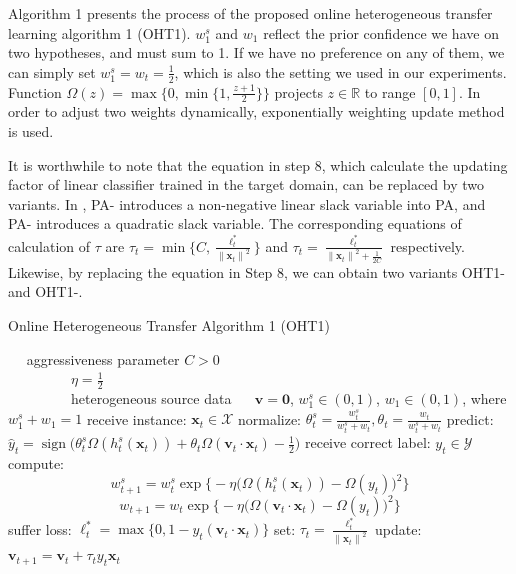 \documentclass[letterpaper]{article}
\theoremstyle{remark}
\theoremstyle{definition}
\DeclareMathOperator{\sign}{sign}
\begin{document}
Algorithm 1 presents the process of the proposed online heterogeneous transfer learning algorithm 1 (OHT1).
$w_{1}^{s}$ and $w_1$ reflect the prior confidence we have on two hypotheses, and must sum to 1.
If we have no preference on any of them, we can simply set $w_{1}^{s} = w_{t} = \frac{1}{2}$, which is also the setting we used in our experiments.
Function $\varOmega(z) = \max \{ 0, \min \{ 1, \frac{z+1}{2} \}\}$ projects $z \in \mathbb{R}$ to range $[0,1]$.
In order to adjust two weights dynamically, exponentially weighting update method \cite{cesa2006prediction} is used.

It is worthwhile to note that the equation in step 8, which calculate the updating factor of linear classifier trained in the target domain, can be replaced by two variants.
In \cite{crammer2006online}, PA-\uppercase\expandafter{} introduces a non-negative linear slack variable into PA, and PA-\uppercase\expandafter{} introduces a quadratic slack variable.
The corresponding equations of calculation of $\tau$ are $\tau_t = \min \{ C, \frac{\ell_{t}^{*}}{{\|\mathbf{x}_t\|}^2} \} $ and $ \tau_t = \frac{\ell_{t}^{*}}{{\|\mathbf{x}_t\|}^2 + \frac{1}{2C}} $ respectively.
Likewise, by replacing the equation in Step 8, we can obtain two variants OHT1-\uppercase\expandafter{} and OHT1-\uppercase\expandafter{}.

\begin{algorithm}
\begin{algorithmic}[1]
\caption{Online Heterogeneous Transfer Algorithm 1 (OHT1)}
\REQUIRE ~~
aggressiveness parameter $C>0$\\ 
~~~~~~~~~$\eta = \frac{1}{2}$ \\
~~~~~~~~~heterogeneous source data
\ENSURE ~~
$\mathbf{v} = \mathbf{0}$, $w_{1}^{s} \in (0,1)$, $w_{1} \in (0,1)$, where $w_{1}^{s} + w_1 = 1$
\STATE 
  receive instance: $\mathbf{x}_t \in \mathcal{X}$
\STATE
  normalize: $\theta_{t}^{s} = \frac{w_{t}^{s}}{w_{t}^{s}+w_t}, \theta_{t} = \frac{w_{t}}{w_{t}^{s}+w_t}$
\STATE
  predict: $\hat{y}_t = \sign \big( \theta_{t}^{s} \varOmega (h_{t}^{s}(\mathbf{x}_t)) + \theta_{t} \varOmega (\mathbf{v}_t \cdot \mathbf{x}_t) - \frac{1}{2} \big)$
\STATE
  receive correct label: $y_t \in \mathcal{Y}$
\STATE
  compute: 
    $$w_{t+1}^{s} = w_{t}^{s} \exp \big\{ -\eta \big(\varOmega(h_{t}^{s}(\mathbf{x}_t)) - \varOmega(y_t)\big)^2 \big\} $$
    $$w_{t+1} = w_{t} \exp \big\{ -\eta \big(\varOmega(\mathbf{v}_t \cdot \mathbf{x}_t) - \varOmega(y_t)\big)^2 \big\} $$
\STATE
  suffer loss: $\ell_{t}^{*} = \max \{0, 1-y_t(\mathbf{v}_t \cdot \mathbf{x}_t)\}$
\STATE
  set: $\tau_t = \frac{\ell_{t}^{*}}{{\|\mathbf{x}_t\|}^2}$
\STATE
  update: $ \mathbf{v}_{t+1} = \mathbf{v}_t + \tau_t y_t \mathbf{x}_t $
\ENDFOR
\end{algorithmic}
\end{algorithm}
\end{document}

